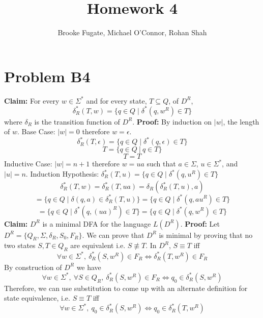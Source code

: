 \documentclass[12pt]{article}
\begin{document}
\pagestyle{plain}
\titleformat{\subsection}[runin]
  {\normalfont\large\bfseries}{\thesubsection}{1em}{}

\title{Homework 4}
\author{Brooke Fugate, Michael O'Connor, Rohan Shah}
\date{}

\maketitle

\section*{Problem B4}
\textbf{Claim: } For every $w \in \Sigma^*$ and for every state, $T\subseteq Q$,
of $D^R$,
$$\delta_R^*(T, w) = \{q\in Q \mid \delta^*(q, w^R) \in T\}$$
where $\delta_R$ is the transition function of $D^R$.
\newline
\textbf{Proof: } By induction on $|w|$, the length of $w$.
\newline
Base Case: $|w|= 0$ therefore $w = \epsilon$.
$$\delta_R^*(T, \epsilon) = \{q\in Q \mid \delta^*(q, \epsilon) \in T\}$$
$$T = \{q \in Q\ |\ q \in T\}$$
$$T = T$$
\newline
Inductive Case: $|w| = n+1$ therefore $w = ua$ such that $a \in \Sigma$,
$u \in \Sigma^*$, and $|u| = n$.
Induction Hypothesis: $\delta_R^*(T, u) = \{q\in Q \mid \delta^*(q, u^R) \in T\}$
$$\delta_R^*(T, w) = \delta_R^*(T, ua) = \delta_R(\delta_R^*(T,u),a)$$
$$= \{q \in Q \mid \delta(q,a) \in \delta_R^*(T,u)\} =
\{q\in Q \mid \delta^*(q, au^R) \in T\}$$
$$= \{q\in Q \mid \delta^*(q, (ua)^R) \in T\} =
\{q\in Q \mid \delta^*(q, w^R) \in T\}$$
\medskip
\newline
\textbf{Claim: } $D^R$ is a minimal DFA for the language $L(D^R)$.
\newline
\textbf{Proof: } Let $D^R = \{Q_R, \Sigma, \delta_R, S_0, F_R\}$. We can prove
that $D^R$ is minimal by proving that no two states $S, T \in Q_R$ are
equivalent i.e. $S \not\equiv T$. In $D^R$, $S \equiv T$ iff
$$ \forall w \in \Sigma^*,\ \delta_R^*(S,w^R) \in F_R \iff
\delta_R^*(T,w^R) \in F_R$$
By construction of $D^R$ we have
$$ \forall w \in \Sigma^*,\ \forall S \in Q_R,\ \delta_R^*(S, w^R) \in F_R \iff
q_0 \in \delta_R^*(S, w^R)$$
Therefore, we can use substitution to come up with an alternate definition for
state equivalence, i.e. $S \equiv T$ iff
$$ \forall w \in \Sigma^*,\ q_0 \in \delta_R^*(S, w^R) \iff
q_0 \in \delta_R^*(T, w^R)$$
\end{document}
